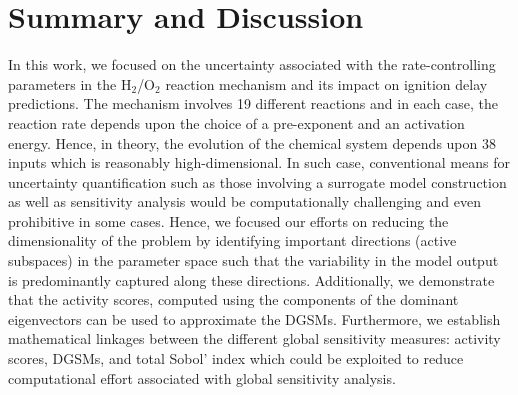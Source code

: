 \section{Summary and Discussion}
\label{sec:conc}

%
 
 In this work, we focused on the uncertainty associated with the rate-controlling parameters in
 the H$_2$/O$_2$ reaction mechanism and its impact on ignition delay predictions. The mechanism
 involves 19 different reactions and in each case, the reaction rate depends upon the choice of
 a pre-exponent and an activation energy. Hence, in theory, the evolution of the chemical system
 depends upon 38 inputs which is reasonably high-dimensional. In such case, conventional means
 for uncertainty quantification such as those involving a surrogate model construction as well as
 sensitivity analysis would be computationally challenging and even prohibitive in some cases. 
 Hence, we focused our efforts on reducing the dimensionality of the problem by identifying important
 directions (active subspaces) in the parameter space such that the variability in the model output is 
 predominantly captured along these directions. Additionally, we demonstrate that the activity scores,
 computed using the components of the dominant eigenvectors can be used to approximate the
 DGSMs. Furthermore, we establish mathematical linkages between the different global sensitivity measures:
 activity scores, DGSMs, and total Sobol' index which could be exploited to reduce computational effort 
 associated with global sensitivity analysis. 
 
